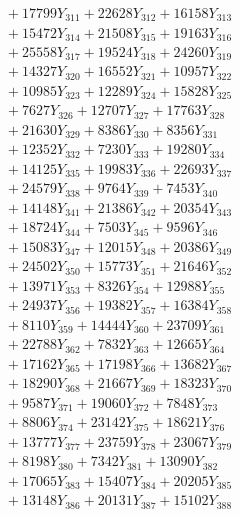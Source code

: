 \documentclass[a4paper,10pt]{article}
\begin{document}
{\begin{align}
&\;  + 17799 Y_{311} + 22628 Y_{312} + 16158 Y_{313} \\[0.3ex]
&\;  + 15472 Y_{314} + 21508 Y_{315} + 19163 Y_{316} \\[0.3ex]
&\;  + 25558 Y_{317} + 19524 Y_{318} + 24260 Y_{319} \\[0.3ex]
&\;  + 14327 Y_{320} + 16552 Y_{321} + 10957 Y_{322} \\[0.3ex]
&\;  + 10985 Y_{323} + 12289 Y_{324} + 15828 Y_{325} \\[0.3ex]
&\;  + 7627 Y_{326} + 12707 Y_{327} + 17763 Y_{328} \\[0.5ex]\allowbreak
&\;  + 21630 Y_{329} + 8386 Y_{330} + 8356 Y_{331} \\[0.3ex]
&\;  + 12352 Y_{332} + 7230 Y_{333} + 19280 Y_{334} \\[0.3ex]
&\;  + 14125 Y_{335} + 19983 Y_{336} + 22693 Y_{337} \\[0.3ex]
&\;  + 24579 Y_{338} + 9764 Y_{339} + 7453 Y_{340} \\[0.3ex]
&\;  + 14148 Y_{341} + 21386 Y_{342} + 20354 Y_{343} \\[0.3ex]
&\;  + 18724 Y_{344} + 7503 Y_{345} + 9596 Y_{346} \\[0.3ex]
&\;  + 15083 Y_{347} + 12015 Y_{348} + 20386 Y_{349} \\[0.3ex]
&\;  + 24502 Y_{350} + 15773 Y_{351} + 21646 Y_{352} \\[0.3ex]
&\;  + 13971 Y_{353} + 8326 Y_{354} + 12988 Y_{355} \\[0.3ex]
&\;  + 24937 Y_{356} + 19382 Y_{357} + 16384 Y_{358} \\[0.5ex]\allowbreak
&\;  + 8110 Y_{359} + 14444 Y_{360} + 23709 Y_{361} \\[0.3ex]
&\;  + 22788 Y_{362} + 7832 Y_{363} + 12665 Y_{364} \\[0.3ex]
&\;  + 17162 Y_{365} + 17198 Y_{366} + 13682 Y_{367} \\[0.3ex]
&\;  + 18290 Y_{368} + 21667 Y_{369} + 18323 Y_{370} \\[0.3ex]
&\;  + 9587 Y_{371} + 19060 Y_{372} + 7848 Y_{373} \\[0.3ex]
&\;  + 8806 Y_{374} + 23142 Y_{375} + 18621 Y_{376} \\[0.3ex]
&\;  + 13777 Y_{377} + 23759 Y_{378} + 23067 Y_{379} \\[0.3ex]
&\;  + 8198 Y_{380} + 7342 Y_{381} + 13090 Y_{382} \\[0.3ex]
&\;  + 17065 Y_{383} + 15407 Y_{384} + 20205 Y_{385} \\[0.3ex]
&\;  + 13148 Y_{386} + 20131 Y_{387} + 15102 Y_{388} \\[0.5ex]\allowbreak

\end{align}}
\end{document}
